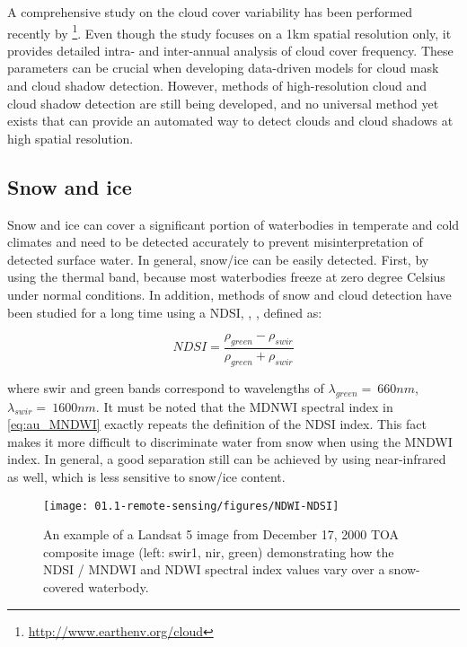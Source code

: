 A comprehensive study on the cloud cover variability has been performed recently by \citet{wilson2016remotely}\footnote{\url{http://www.earthenv.org/cloud}}. Even though the study focuses on a 1km spatial resolution only, it provides detailed intra- and inter-annual analysis of cloud cover frequency. These parameters can be crucial when developing data-driven models for cloud mask and cloud shadow detection. However, methods of high-resolution cloud and cloud shadow detection are still being developed, and no universal method yet exists that can provide an automated way to detect clouds and cloud shadows at high spatial resolution. 

\subsection{Snow and ice}

Snow and ice can cover a significant portion of waterbodies in temperate and cold climates and need to be detected accurately to prevent misinterpretation of detected surface water. In general, snow/ice can be easily detected. First, by using the thermal band, because most waterbodies freeze at zero degree Celsius under normal conditions. In addition, methods of snow and cloud detection have been studied for a long time using a \gls{NDSI}, \citet{valovcin1976snow}, \citet{hall1995development}, defined as:

\begin{equation}
NDSI=\frac{\rho_{green}-\rho_{swir}}{\rho_{green}+\rho_{swir}}
\end{equation}

where swir and green bands correspond to wavelengths of $\lambda_{green}=~660nm$, $\lambda_{swir}=~1600nm$. It must be noted that the MDNWI spectral index in \ref{eq:au_MNDWI} exactly repeats the definition of the \gls{NDSI} index. This fact makes it more difficult to discriminate water from snow when using the \gls{MNDWI} index. In general, a good separation still can be achieved by using near-infrared as well, which is less sensitive to snow/ice content.

\begin{figure}[H]
	\texttt{[image: 01.1-remote-sensing/figures/NDWI-NDSI]}
	\caption{An example of a Landsat 5 image from December 17, 2000 TOA composite image (left: swir1, nir, green) demonstrating how the \gls{NDSI} / \gls{MNDWI} and \gls{NDWI} spectral index values vary over a snow-covered waterbody. }
	\label{fig:snow}
\end{figure}

